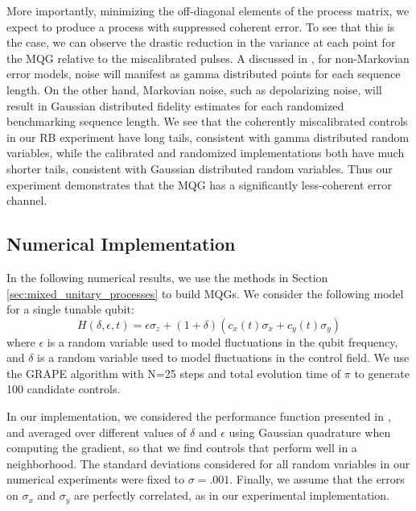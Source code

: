 \documentclass[aps,nofootinbib,pra,notitlepage,twocolumn]{revtex4-1}
\begin{document}
More importantly, minimizing the off-diagonal elements of the process matrix, we expect to produce a process with suppressed coherent error. To see that this is the case, we can observe the drastic reduction in the variance at each point for the MQG relative to the miscalibrated pulses. A discussed in \cite{Ball2016}, for non-Markovian error models, noise will manifest as gamma distributed points for each sequence length. On the other hand, Markovian noise, such as depolarizing noise, will result in Gaussian distributed fidelity estimates for each randomized benchmarking sequence length. We see that the coherently miscalibrated controls in our RB experiment have long tails, consistent with gamma distributed random variables, while the calibrated and randomized implementations both have much shorter tails, consistent with Gaussian distributed random variables. Thus our experiment demonstrates that the MQG has a significantly less-coherent error channel.


\subsection{Numerical Implementation}
\label{sec:numerical_results}
In the following numerical results, we use the methods in Section \ref{sec:mixed_unitary_processes} to build MQGs. We consider the following model for a single tunable qubit: 
\begin{equation}\label{eq:1Qham}
  H(\delta, \epsilon, t) = \epsilon\sigma_z + (1 + \delta)(c_x(t)\sigma_x + c_y(t)\sigma_y)
\end{equation}
where $\epsilon$ is a random variable used to model fluctuations in the qubit frequency, and $\delta$ is a random variable used to model fluctuations in the control field. We use the GRAPE algorithm\cite{Khaneja2005} with N=25 steps and total evolution time of $\pi$ to generate 100 candidate controls. 

In our implementation, we considered the performance function presented in \cite{Khaneja2005}, and averaged over different values of $\delta$ and $\epsilon$ using Gaussian quadrature when computing the gradient, so that we find controls that perform well in a neighborhood. The standard deviations considered for all random variables in our numerical experiments were fixed to $\sigma=.001$. Finally, we assume that the errors on $\sigma_x$ and $\sigma_y$ are perfectly correlated, as in our experimental implementation.
\end{document}
